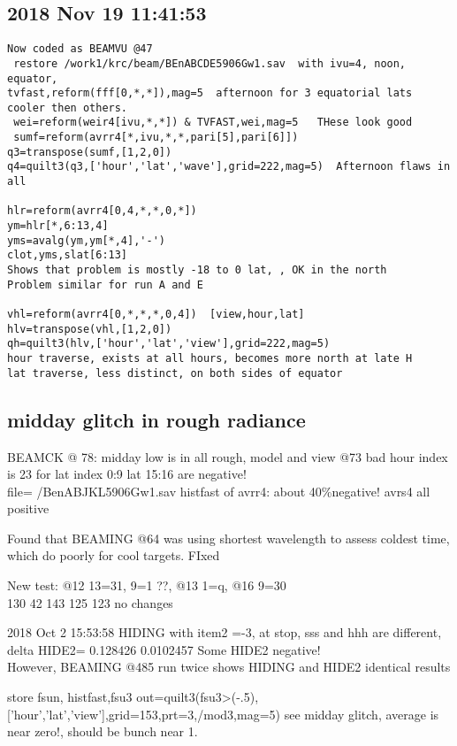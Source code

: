 \documentclass{article}
\begin{document}
\subsection{2018 Nov 19 11:41:53}
\vspace{-3.mm} 
\begin{verbatim}
Now coded as BEAMVU @47
 restore /work1/krc/beam/BEnABCDE5906Gw1.sav  with ivu=4, noon, equator, 
tvfast,reform(fff[0,*,*]),mag=5  afternoon for 3 equatorial lats cooler then others.
 wei=reform(weir4[ivu,*,*]) & TVFAST,wei,mag=5   THese look good
 sumf=reform(avrr4[*,ivu,*,*,pari[5],pari[6]])
q3=transpose(sumf,[1,2,0])
q4=quilt3(q3,['hour','lat','wave'],grid=222,mag=5)  Afternoon flaws in all

hlr=reform(avrr4[0,4,*,*,0,*])  
ym=hlr[*,6:13,4]       
yms=avalg(ym,ym[*,4],'-')
clot,yms,slat[6:13]    
Shows that problem is mostly -18 to 0 lat, , OK in the north
Problem similar for run A and E 

vhl=reform(avrr4[0,*,*,*,0,4])  [view,hour,lat]
hlv=transpose(vhl,[1,2,0])
qh=quilt3(hlv,['hour','lat','view'],grid=222,mag=5)
hour traverse, exists at all hours, becomes more north at late H
lat traverse, less distinct, on both sides of equator
\end{verbatim} 


\subsection{midday glitch in rough radiance}
BEAMCK @ 78:  midday low is in all rough, model and view
\qi @73  bad hour index is 23 for lat index 0:9   lat 15:16 are negative!
\\ file= /BenABJKL5906Gw1.sav
\qi histfast of avrr4: about 40\%negative!
\qi avrs4 all positive

Found that BEAMING @64 was using shortest wavelength to assess coldest time, which  do poorly for cool targets. FIxed 


New test: @12 13=31, 9=1 ??,  @13 1=q,    @16 9=30 
\\ 130 42  143  125 123 no changes


2018 Oct 2 15:53:58  HIDING with item2 =-3, at stop, sss and hhh are different, 
\qi delta HIDE2=     0.128426    0.0102457   Some HIDE2 negative!
\\ However, BEAMING @485 run twice shows HIDING and HIDE2  identical results

store fsun,
\qi  histfast,fsu3
\qi  out=quilt3(fsu3>(-.5),['hour','lat','view'],grid=153,prt=3,/mod3,mag=5)
\qi  see midday glitch, average is near zero!, should be bunch near 1.
\end{document}
